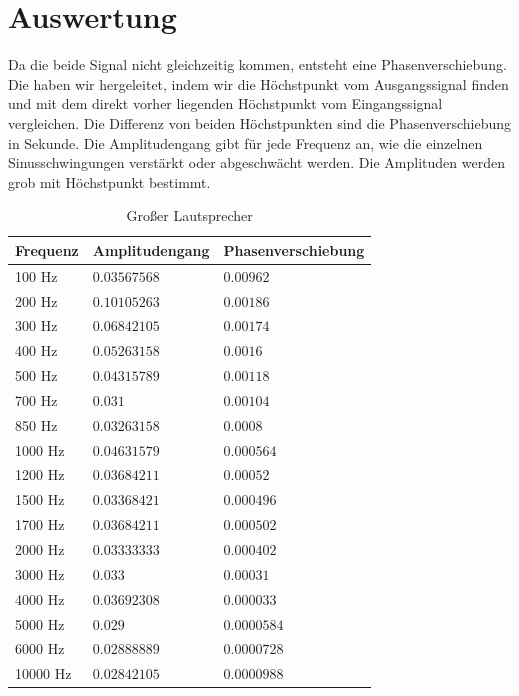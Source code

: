 \documentclass[12pt, oneside, a4paper, \docLanguage]{report}
\begin{document}
\section{Auswertung}

\label{chap:VERSUCH_2_AUSWERTUNG}

Da die beide Signal nicht gleichzeitig kommen, entsteht eine Phasenverschiebung. Die haben wir hergeleitet, indem wir die Höchstpunkt vom Ausgangssignal finden und mit dem direkt vorher liegenden Höchstpunkt vom Eingangssignal vergleichen. Die Differenz von beiden Höchstpunkten sind die Phasenverschiebung in Sekunde. Die Amplitudengang  gibt für jede Frequenz an, wie die einzelnen Sinusschwingungen verstärkt oder abgeschwächt werden. Die Amplituden werden grob mit Höchstpunkt bestimmt.


\begin{table}[H]
\centering
\begin{tabular}{|l|l|l|}
\hline
\multicolumn{1}{|c|}{Frequenz} & \multicolumn{1}{c|}{Amplitudengang}		& \multicolumn{1}{c|}{Phasenverschiebung}			\\ \hline
100 Hz						&$0.03567568$			&$0.00962$				\\ \hline
200 Hz						&$0.10105263$			&$0.00186$				\\ \hline
300 Hz						&$0.06842105$			&$0.00174$				\\ \hline
400 Hz						&$0.05263158$			&$0.0016$				\\ \hline
500 Hz						&$0.04315789$			&$0.00118$				\\ \hline
700 Hz						&$0.031$				&$0.00104$				\\ \hline
850 Hz						&$0.03263158$			&$0.0008$				\\ \hline
1000 Hz						&$0.04631579$			&$0.000564$				\\ \hline
1200 Hz						&$0.03684211$			&$0.00052$				\\ \hline
1500 Hz						&$0.03368421$			&$0.000496$				\\ \hline
1700 Hz						&$0.03684211$			&$0.000502$				\\ \hline
2000 Hz						&$0.03333333$			&$0.000402$				\\ \hline
3000 Hz						&$0.033$				&$0.00031$				\\ \hline
4000 Hz						&$0.03692308$			&$0.000033$				\\ \hline
5000 Hz						&$0.029$				&$0.0000584$				\\ \hline
6000 Hz						&$0.02888889$			&$0.0000728$				\\ \hline
10000 Hz					&$0.02842105$			&$0.0000988$				\\ \hline
\end{tabular}
\caption{Großer Lautsprecher}
\end{table}
\end{document}
